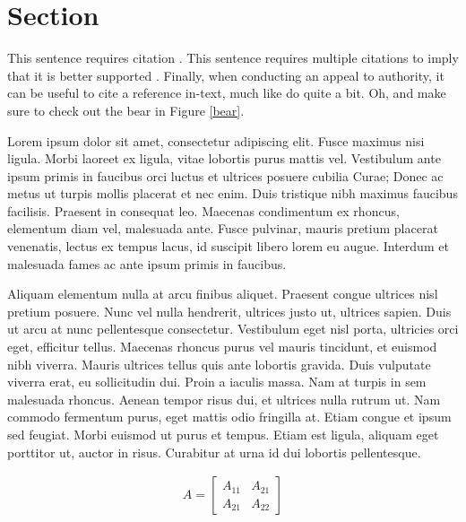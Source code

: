 
\section{Section}
This sentence requires citation \citep{Reference1}. This sentence requires multiple citations to imply that it is better supported \citep{Reference2,Reference3}. Finally, when conducting an appeal to authority, it can be useful to cite a reference in-text, much like \cite{Reference1} do quite a bit. Oh, and make sure to check out the bear in Figure \ref{bear}.

Lorem ipsum dolor sit amet, consectetur adipiscing elit. Fusce maximus nisi ligula. Morbi laoreet ex ligula, vitae lobortis purus mattis vel. Vestibulum ante ipsum primis in faucibus orci luctus et ultrices posuere cubilia Curae; Donec ac metus ut turpis mollis placerat et nec enim. Duis tristique nibh maximus faucibus facilisis. Praesent in consequat leo. Maecenas condimentum ex rhoncus, elementum diam vel, malesuada ante. Fusce pulvinar, mauris pretium placerat venenatis, lectus ex tempus lacus, id suscipit libero lorem eu augue. Interdum et malesuada fames ac ante ipsum primis in faucibus.

Aliquam elementum nulla at arcu finibus aliquet. Praesent congue ultrices nisl pretium posuere. Nunc vel nulla hendrerit, ultrices justo ut, ultrices sapien. Duis ut arcu at nunc pellentesque consectetur. Vestibulum eget nisl porta, ultricies orci eget, efficitur tellus. Maecenas rhoncus purus vel mauris tincidunt, et euismod nibh viverra. Mauris ultrices tellus quis ante lobortis gravida. Duis vulputate viverra erat, eu sollicitudin dui. Proin a iaculis massa. Nam at turpis in sem malesuada rhoncus. Aenean tempor risus dui, et ultrices nulla rutrum ut. Nam commodo fermentum purus, eget mattis odio fringilla at. Etiam congue et ipsum sed feugiat. Morbi euismod ut purus et tempus. Etiam est ligula, aliquam eget porttitor ut, auctor in risus. Curabitur at urna id dui lobortis pellentesque.

\begin{align}
	A =
	\begin{bmatrix}
		A_{11} & A_{21} \\
		A_{21} & A_{22}
	\end{bmatrix}
\end{align}

